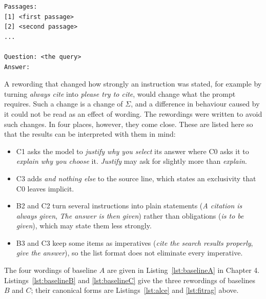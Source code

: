 \documentclass[12pt,a4paper,oneside]{scrreprt}
\begin{document}
\begin{lstlisting}[style=promptbox,caption={The user turn. It is identical in every condition.},label={lst:userturn}]
Passages:
[1] <first passage>
[2] <second passage>
...

Question: <the query>
Answer:
\end{lstlisting}



A rewording that changed how strongly an instruction was stated, for example by turning \textit{always cite} into \textit{please try to cite}, would change what the prompt requires. Such a change is a change of $\Sigma$, and a difference in behaviour caused by it could not be read as an effect of wording. The rewordings were written to avoid such changes. In four places, however, they come close. These are listed here so that the results can be interpreted with them in mind:
\begin{itemize}
    \item C1 asks the model to \textit{justify why you select} its answer where C0 asks it to \textit{explain why you choose} it. \textit{Justify} may ask for slightly more than \textit{explain}.
    \item C3 adds \textit{and nothing else} to the source line, which states an exclusivity that C0 leaves implicit.
    \item B2 and C2 turn several instructions into plain statements (\textit{A citation is always given}, \textit{The answer is then given}) rather than obligations (\textit{is to be given}), which may state them less strongly.
    \item B3 and C3 keep some items as imperatives (\textit{cite the search results properly}, \textit{give the answer}), so the list format does not eliminate every imperative.
\end{itemize}

The four wordings of baseline $A$ are given in Listing~\ref{lst:baselineA} in Chapter 4. Listings~\ref{lst:baselineB} and \ref{lst:baselineC} give the three rewordings of baselines $B$ and $C$; their canonical forms are Listings~\ref{lst:alce} and \ref{lst:fitrag} above.
\end{document}
